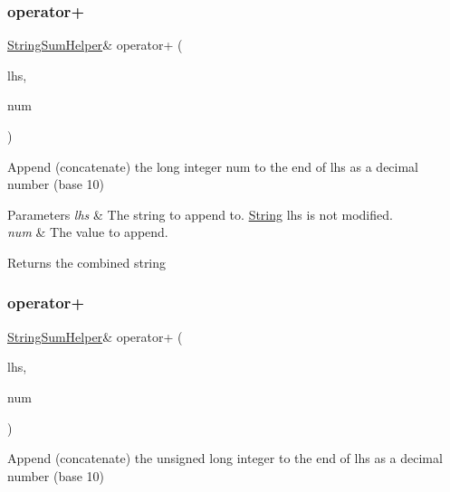 \subsubsection{\texorpdfstring{operator+}{operator+}\hspace{0.1cm}{\footnotesize\ttfamily [7/10]}}
{\footnotesize\ttfamily \hyperlink{class_string_sum_helper}{String\+Sum\+Helper}\& operator+ (\begin{DoxyParamCaption}\item[{const \hyperlink{class_string_sum_helper}{String\+Sum\+Helper} \&}]{lhs,  }\item[{long}]{num }\end{DoxyParamCaption})\hspace{0.3cm}{\ttfamily [friend]}}



Append (concatenate) the long integer num to the end of lhs as a decimal number (base 10) 


\begin{DoxyParams}{Parameters}
{\em lhs} & The string to append to. \hyperlink{class_string}{String} lhs is not modified.\\
\hline
{\em num} & The value to append.\\
\hline
\end{DoxyParams}
\begin{DoxyReturn}{Returns}
the combined string 
\end{DoxyReturn}
\mbox{\label{class_string_a61625af689cfcbe9206851903b1144a2}} 
\subsubsection{\texorpdfstring{operator+}{operator+}\hspace{0.1cm}{\footnotesize\ttfamily [8/10]}}
{\footnotesize\ttfamily \hyperlink{class_string_sum_helper}{String\+Sum\+Helper}\& operator+ (\begin{DoxyParamCaption}\item[{const \hyperlink{class_string_sum_helper}{String\+Sum\+Helper} \&}]{lhs,  }\item[{unsigned long}]{num }\end{DoxyParamCaption})\hspace{0.3cm}{\ttfamily [friend]}}



Append (concatenate) the unsigned long integer to the end of lhs as a decimal number (base 10) 


